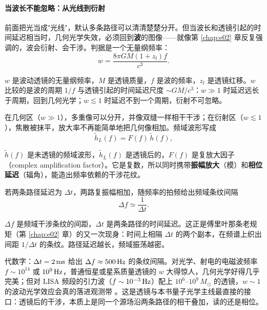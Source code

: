\paragraph{当波长不能忽略：从光线到衍射}
\label{sec:e21-wavelensing}

前面把光当成"光线"，默认多条路径可以清清楚楚分开。但当波长和透镜引起的时间延迟相当时，几何光学失效，必须回到\textbf{波}的图像——就像第 \ref{chap:e02} 章反复强调的，波会衍射、会干涉。判据是一个无量纲频率：
\begin{equation}
  w
  =
  \frac{8\pi GM(1+z_l)f}{c^3}.
  \label{eq:e21-wave-lensing-w}
\end{equation}
\begin{formulaexplain}
\(w\) 是波动透镜的无量纲频率，\(M\) 是透镜质量，\(f\) 是波的频率，\(z_l\) 是透镜红移。\(w\) 比较的是波的周期 \(1/f\) 与透镜引起的时间延迟尺度 \(\sim GM/c^3\)：\(w\gg1\) 时延迟远长于周期，回到几何光学；\(w\lesssim1\) 时延迟不到一个周期，衍射不可忽略。
\end{formulaexplain}
在几何区（\(w\gg1\)），多重像可以分开，并像双缝一样相干干涉；在衍射区（\(w\lesssim1\)），焦散被抹平，放大率不再能简单地把几何像相加。频域波形写成
\begin{equation}
  \tilde h_L(f)=F(f)\,\tilde h(f),
  \label{eq:e21-wave-amplification}
\end{equation}
\begin{formulaexplain}
\(\tilde h(f)\) 是未透镜的频域波形，\(\tilde h_L(f)\) 是透镜后的，\(F(f)\) 是复放大因子（complex amplification factor）。它是复数，所以同时携带\textbf{振幅放大}（模）和\textbf{相位延迟}（辐角），能造出频率依赖的干涉花纹。
\end{formulaexplain}
若两条路径延迟为 \(\Delta t\)，两路复振幅相加，随频率的拍频给出频域条纹间隔
\begin{equation}
  \Delta f \simeq \frac{1}{\Delta t}.
  \label{eq:e21-lensing-fringe-spacing}
\end{equation}
\begin{formulaexplain}
\(\Delta f\) 是频域干涉条纹的间距，\(\Delta t\) 是两条路径的时间延迟。这正是傅里叶那条老规矩（第 \ref{chap:e02} 章）的又一次现身：时间上相隔 \(\Delta t\) 的两个副本，在频谱上织出间距 \(1/\Delta t\) 的条纹。路径延迟越长，频域振荡越密。
\end{formulaexplain}
代数字：\(\Delta t=2\,{\rm ms}\) 给出 \(\Delta f\approx500\,{\rm Hz}\) 的条纹间隔。对光学、射电的电磁波频率 \(f\sim10^{14}\) 或 \(10^{9}\,{\rm Hz}\)，普通恒星或星系质量透镜的 \(w\) 大得惊人，几何光学好得几乎完美；但对 LISA 频段的引力波（\(f\sim10^{-3}\,{\rm Hz}\)）配上 \(10^{6}\text{--}10^{9}\,M_\odot\) 的透镜，\(w\sim1\) 的波动光学效应会真的落进观测带 \citep{2003ApJ...595.1039T}。这是透镜与本书量子光学主线最直接的接口：透镜后的干涉，本质上是同一个源场沿两条路径的相干叠加，读的还是相位。

